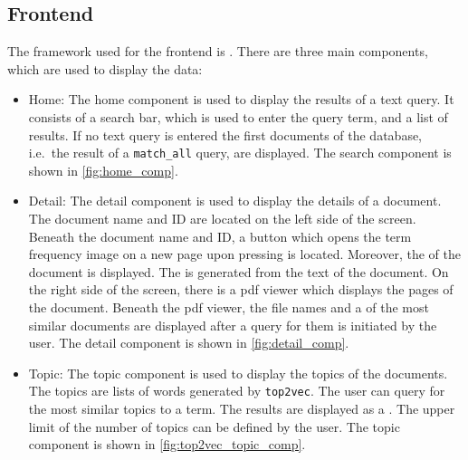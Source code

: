 




\subsection{Frontend}\label{subsec:frontend}

The framework used for the frontend is \angular{}.
There are three main components, which are used to display the data:

\begin{itemize}
    \item \label{pt:home}Home: 
        The home component is used to display the results of a text query.
        It consists of a search bar, which is used to enter the query term, and a list of results.
        If no text query is entered the first documents of the database, i.e.\ the result of a \texttt{match\_all} query, are displayed.
        The search component is shown in \autoref{fig:home_comp}.

    \item \label{pt:detail}Detail: 
        The detail component is used to display the details of a document.
        The document name and ID are located on the left side of the screen.
        Beneath the document name and ID, a button which opens the term frequency image on a new page upon pressing is located. 
        Moreover, the \wordcloud{} of the document is displayed.
        The \wordcloud{} is generated from the text of the document.
        On the right side of the screen, there is a \ac{pdf} viewer which displays the pages of the document.
        Beneath the \ac{pdf} viewer, the file names and a \wordcloud{} of the most similar documents are displayed after a query for them is initiated by the user.
        The detail component is shown in \autoref{fig:detail_comp}.

    \item \label{pt:topic}Topic: 
        The topic component is used to display the topics of the documents.
        The topics are lists of words generated by \texttt{top2vec}.
        The user can query for the most similar topics to a term.
        The results are displayed as a \wordcloud{}.
        The upper limit of the number of topics can be defined by the user.
        The topic component is shown in \autoref{fig:top2vec_topic_comp}.
\end{itemize}


